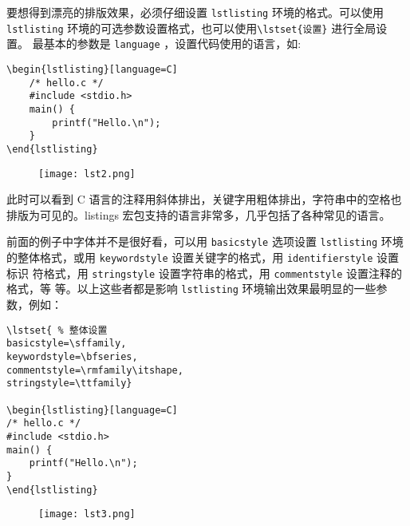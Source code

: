 要想得到漂亮的排版效果，必须仔细设置 \verb|lstlisting| 环境的格式。可以使用 \verb|lstlisting| 环境的可选参数设置格式，也可以使用\verb|\lstset{设置}| 进行全局设置。
最基本的参数是 \verb|language| ，设置代码使用的语言，如:

\begin{minipage}[t]{0.45\textwidth}
\begin{verbatim}
\begin{lstlisting}[language=C]
    /* hello.c */
    #include <stdio.h>
    main() {
        printf("Hello.\n");
    }
\end{lstlisting}
\end{verbatim}
\end{minipage}
\hfill
\begin{minipage}[t]{0.45\textwidth}
    \begin{figure}[H]
        \centering
        \texttt{[image: lst2.png]}
    \end{figure}
\end{minipage}

\vspace{0.1cm}
此时可以看到 C 语言的注释用斜体排出，关键字用粗体排出，字符串中的空格也排版为可见的。listings 宏包支持的语言非常多，几乎包括了各种常见的语言。

前面的例子中字体并不是很好看，可以用 \verb|basicstyle| 选项设置 \verb|lstlisting| 环境
的整体格式，或用 \verb|keywordstyle| 设置关键字的格式，用 \verb|identifierstyle| 设置标识
符格式，用 \verb|stringstyle| 设置字符串的格式，用 \verb|commentstyle| 设置注释的格式，等
等。以上这些者都是影响 \verb|lstlisting| 环境输出效果最明显的一些参数，例如：

\begin{minipage}[t]{0.45\textwidth}
\begin{verbatim}
\lstset{ % 整体设置
basicstyle=\sffamily,
keywordstyle=\bfseries,
commentstyle=\rmfamily\itshape,
stringstyle=\ttfamily}

\begin{lstlisting}[language=C]
/* hello.c */
#include <stdio.h>
main() {
    printf("Hello.\n");
}
\end{lstlisting}
\end{verbatim}
\end{minipage}
\hfill
\begin{minipage}[t]{0.45\textwidth}
    \begin{figure}[H]
        \centering
        \texttt{[image: lst3.png]}
    \end{figure}
\end{minipage}

